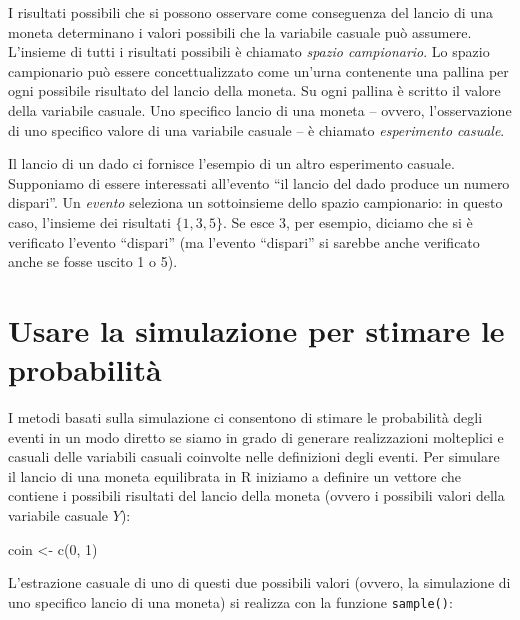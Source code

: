 \documentclass[
  10pt,
  italian,
  a4paper,
  extrafontsizes,onecolumn,openright
  ]{memoir}
\newenvironment{Shaded}{\begin{snugshade}}{\end{snugshade}}
\newcommand{\DecValTok}[1]{\textcolor[rgb]{0.00,0.00,0.81}{#1}}
\newcommand{\FunctionTok}[1]{\textcolor[rgb]{0.00,0.00,0.00}{#1}}
\newcommand{\NormalTok}[1]{#1}
\newcommand{\OtherTok}[1]{\textcolor[rgb]{0.56,0.35,0.01}{#1}}
\theoremstyle{definition}
\theoremstyle{definition}
\theoremstyle{definition}
\theoremstyle{definition}
\theoremstyle{remark}
\begin{document}
I risultati possibili che si possono osservare come conseguenza del lancio di una moneta determinano i valori possibili che la variabile casuale può assumere. L'insieme di tutti i risultati possibili è chiamato \emph{spazio campionario}. Lo spazio campionario può essere concettualizzato come un'urna contenente una pallina per ogni possibile risultato del lancio della moneta. Su ogni pallina è scritto il valore della variabile casuale. Uno specifico lancio di una moneta -- ovvero, l'osservazione di uno specifico valore di una variabile casuale -- è chiamato \emph{esperimento casuale}.

Il lancio di un dado ci fornisce l'esempio di un altro esperimento casuale. Supponiamo di essere interessati all'evento ``il lancio del dado produce un numero dispari''. Un \emph{evento} seleziona un sottoinsieme dello spazio campionario: in questo caso, l'insieme dei risultati \(\{1, 3, 5\}\). Se esce 3, per esempio, diciamo che si è verificato l'evento ``dispari'' (ma l'evento ``dispari'' si sarebbe anche verificato anche se fosse uscito 1 o 5).

\hypertarget{usare-la-simulazione-per-stimare-le-probabilituxe0}{%
\section{Usare la simulazione per stimare le probabilità}\label{usare-la-simulazione-per-stimare-le-probabilituxe0}}

I metodi basati sulla simulazione ci consentono di stimare le probabilità degli eventi in un modo diretto se siamo in grado di generare realizzazioni molteplici e casuali delle variabili casuali coinvolte nelle definizioni degli eventi. Per simulare il lancio di una moneta equilibrata in R iniziamo a definire un vettore che contiene i possibili risultati del lancio della moneta (ovvero i possibili valori della variabile casuale \(Y\)):

\begin{Shaded}
\begin{Highlighting}[]
\NormalTok{coin }\OtherTok{\textless{}{-}} \FunctionTok{c}\NormalTok{(}\DecValTok{0}\NormalTok{, }\DecValTok{1}\NormalTok{)}
\end{Highlighting}
\end{Shaded}

\noindent
L'estrazione casuale di uno di questi due possibili valori (ovvero, la simulazione di uno specifico lancio di una moneta) si realizza con la funzione \texttt{sample()}:
\end{document}
